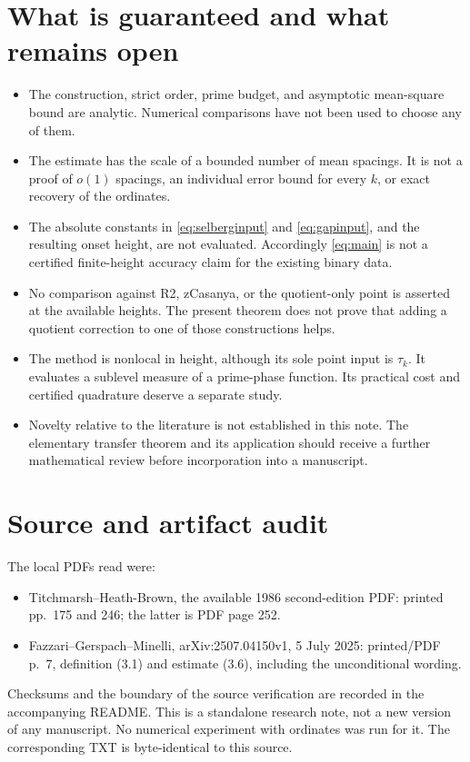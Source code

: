 \documentclass[11pt]{article}
\numberwithin{equation}{section}
\theoremstyle{remark}
\begin{document}
\section{What is guaranteed and what remains open}
\label{sec:limits}
\begin{itemize}[leftmargin=2em]
\item The construction, strict order, prime budget, and asymptotic
mean-square bound are analytic. Numerical comparisons have not been
used to choose any of them.
\item The estimate has the scale of a bounded number of mean spacings.
It is not a proof of \(o(1)\) spacings, an individual error bound for every
\(k\), or exact recovery of the ordinates.
\item The absolute constants in \eqref{eq:selberginput} and
\eqref{eq:gapinput}, and the resulting onset height, are not evaluated.
Accordingly \eqref{eq:main} is not a certified finite-height accuracy
claim for the existing binary data.
\item No comparison against R2, zCasanya, or the quotient-only point is
asserted at the available heights. The present theorem does not prove
that adding a quotient correction to one of those constructions helps.
\item The method is nonlocal in height, although its sole point input is
\(\tau_k\). It evaluates a sublevel measure of a prime-phase function.
Its practical cost and certified quadrature deserve a separate study.
\item Novelty relative to the literature is not established in this note.
The elementary transfer theorem and its application should receive a
further mathematical review before incorporation into a manuscript.
\end{itemize}

\section*{Source and artifact audit}
The local PDFs read were:
\begin{itemize}[leftmargin=2em]
\item Titchmarsh--Heath-Brown, the available 1986 second-edition PDF:
printed pp.~175 and 246; the latter is PDF page 252.
\item Fazzari--Gerspach--Minelli, arXiv:2507.04150v1, 5 July 2025:
printed/PDF p.~7, definition (3.1) and estimate (3.6), including the
unconditional wording.
\end{itemize}
Checksums and the boundary of the source verification are recorded in
the accompanying README. This is a standalone research note, not a new
version of any manuscript. No numerical experiment with ordinates was
run for it. The corresponding TXT is byte-identical to this source.
\end{document}
